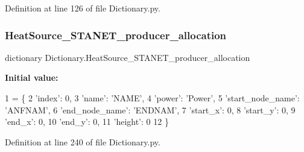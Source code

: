 Definition at line 126 of file Dictionary.\+py.

\mbox{\label{namespace_dictionary_a3edbaf1cfe1d45f0558ddc8cd934b6d3}} 
\subsubsection{\texorpdfstring{Heat\+Source\+\_\+\+S\+T\+A\+N\+E\+T\+\_\+producer\+\_\+allocation}{HeatSource\_STANET\_producer\_allocation}}
{\footnotesize\ttfamily dictionary Dictionary.\+Heat\+Source\+\_\+\+S\+T\+A\+N\+E\+T\+\_\+producer\+\_\+allocation}

{\bfseries Initial value\+:}
\begin{DoxyCode}
1 =  \{
2                                          \textcolor{stringliteral}{'index'}: 0,
3                                          \textcolor{stringliteral}{'name'}: \textcolor{stringliteral}{'NAME'},
4                                          \textcolor{stringliteral}{'power'}: \textcolor{stringliteral}{'Power'},
5                                          \textcolor{stringliteral}{'start\_node\_name'}: \textcolor{stringliteral}{'ANFNAM'},
6                                          \textcolor{stringliteral}{'end\_node\_name'}: \textcolor{stringliteral}{'ENDNAM'},
7                                          \textcolor{stringliteral}{'start\_x'}: 0,
8                                          \textcolor{stringliteral}{'start\_y'}: 0,
9                                          \textcolor{stringliteral}{'end\_x'}: 0,
10                                          \textcolor{stringliteral}{'end\_y'}: 0,
11                                          \textcolor{stringliteral}{'height'}: 0
12                                          \}
\end{DoxyCode}


Definition at line 240 of file Dictionary.\+py.

\mbox{\label{namespace_dictionary_a372356497cc875933e355473f718698c}} 
